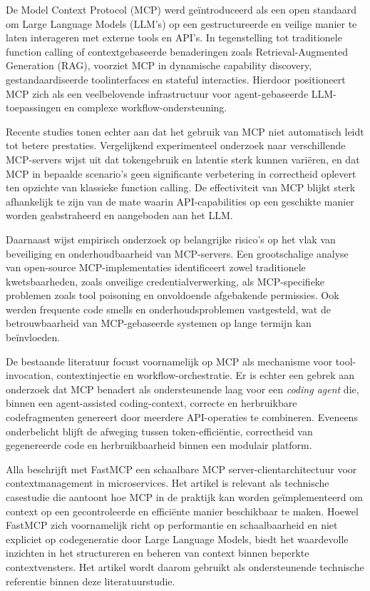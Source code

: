 De Model Context Protocol (MCP) werd geïntroduceerd als een open standaard om Large Language Models (LLM’s) op een gestructureerde en veilige manier te laten interageren met externe tools en API’s. In tegenstelling tot traditionele function calling of contextgebaseerde benaderingen zoals Retrieval-Augmented Generation (RAG), voorziet MCP in dynamische capability discovery, gestandaardiseerde toolinterfaces en stateful interacties. Hierdoor positioneert MCP zich als een veelbelovende infrastructuur voor agent-gebaseerde LLM-toepassingen en complexe workflow-ondersteuning.\cite{Ray_2025}

Recente studies tonen echter aan dat het gebruik van MCP niet automatisch leidt tot betere prestaties. Vergelijkend experimenteel onderzoek naar verschillende MCP-servers wijst uit dat tokengebruik en latentie sterk kunnen variëren, en dat MCP in bepaalde scenario’s geen significante verbetering in correctheid oplevert ten opzichte van klassieke function calling. De effectiviteit van MCP blijkt sterk afhankelijk te zijn van de mate waarin API-capabilities op een geschikte manier worden geabstraheerd en aangeboden aan het LLM.\cite{hou2025modelcontextprotocolmcp}

Daarnaast wijst empirisch onderzoek op belangrijke risico’s op het vlak van beveiliging en onderhoudbaarheid van MCP-servers. Een grootschalige analyse van open-source MCP-implementaties identificeert zowel traditionele kwetsbaarheden, zoals onveilige credentialverwerking, als MCP-specifieke problemen zoals tool poisoning en onvoldoende afgebakende permissies. Ook werden frequente code smells en onderhoudsproblemen vastgesteld, wat de betrouwbaarheid van MCP-gebaseerde systemen op lange termijn kan beïnvloeden.\cite{Hasan2025MCPFirstGlance}

De bestaande literatuur focust voornamelijk op MCP als mechanisme voor tool-invocation, contextinjectie en workflow-orchestratie. Er is echter een gebrek aan onderzoek dat MCP benadert als ondersteunende laag voor een \textit{coding agent} die, binnen een agent-assisted coding-context, correcte en herbruikbare codefragmenten genereert door meerdere API-operaties te combineren. Eveneens onderbelicht blijft de afweging tussen token-efficiëntie, correctheid van gegenereerde code en herbruikbaarheid binnen een modulair platform.

Alla \cite{Alla2025FastMCP} beschrijft met FastMCP een schaalbare MCP server-clientarchitectuur voor contextmanagement in microservices. Het artikel is relevant als technische casestudie die aantoont hoe MCP in de praktijk kan worden geïmplementeerd om context op een gecontroleerde en efficiënte manier beschikbaar te maken. Hoewel FastMCP zich voornamelijk richt op performantie en schaalbaarheid en niet expliciet op codegeneratie door Large Language Models, biedt het waardevolle inzichten in het structureren en beheren van context binnen beperkte contextvensters. Het artikel wordt daarom gebruikt als ondersteunende technische referentie binnen deze literatuurstudie.

